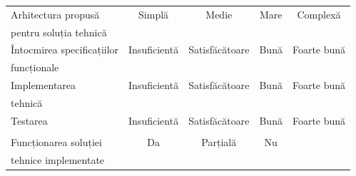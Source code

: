 \begin{flushleft}
{\begin{tabular}{l l c c c c }
	\hline
	\midrule
	\multicolumn{2}{l}{Arhitectura propusă } & 
	Simplă & Medie & Mare & Complexă \\
	\multicolumn{2}{l}{pentru soluția tehnică}	&
	\unCheckedBox\hspace{5pt} & \unCheckedBox\hspace{5pt}  &
	\unCheckedBox\hspace{5pt}  &
	\unCheckedBox\hspace{5pt}  \\
	
	\hline
	\midrule
	\multicolumn{2}{l}{Întocmirea specificațiilor } & 
	Insuficientă & Satisfăcătoare & Bună & Foarte bună \\
	\multicolumn{2}{l}{funcționale}	&
	\unCheckedBox\hspace{5pt} & \unCheckedBox\hspace{5pt}  &
	\unCheckedBox\hspace{5pt}  &
	\unCheckedBox\hspace{5pt}  \\
	
	\hline
	\midrule
	\multicolumn{2}{l}{Implementarea } & 
	Insuficientă & Satisfăcătoare & Bună & Foarte bună \\
	\multicolumn{2}{l}{tehnică}	&
	\unCheckedBox\hspace{5pt} & \unCheckedBox\hspace{5pt}  &
	\unCheckedBox\hspace{5pt}  &
	\unCheckedBox\hspace{5pt}  \\
	
	\hline
	\midrule
	\multicolumn{2}{l}{Testarea} & 
	Insuficientă & Satisfăcătoare & Bună & Foarte bună \\
	\multicolumn{2}{l}{}	&
	\unCheckedBox\hspace{5pt} & \unCheckedBox\hspace{5pt}  &
	\unCheckedBox\hspace{5pt}  &
	\unCheckedBox\hspace{5pt}  \\

	\hline
	\midrule
	\multicolumn{2}{l}{Funcționarea soluției  } & 
	Da & Parțială & Nu &  \\
	\multicolumn{2}{l}{tehnice implementate}	&
	\unCheckedBox\hspace{5pt} & \unCheckedBox\hspace{5pt}  &
	\unCheckedBox\hspace{5pt}  &  \\
	

\end{tabular}}
\end{flushleft}
